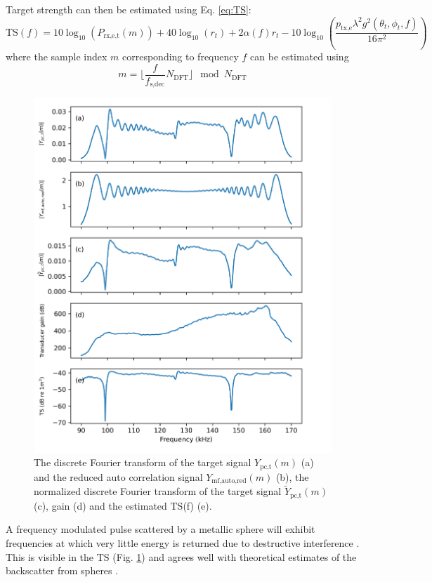 \documentclass[preprint,12pt,TurnOnLineNumbers]{JASAnew}
\newcommand{\freqsym}{f}
\newcommand{\samplesymf}{m}
\newcommand{\fsdec}{f_{\textrm{s,dec}}}
\newcommand{\ptxe}{p_{\textrm{tx,e}}}
\newcommand{\ypctargetf}{Y_{\textrm{pc,t}}}
\newcommand{\ypctargetnormf}{\tilde{Y}_{\textrm{pc,t}}}
\newcommand{\ymfautoredf}{Y_{\textrm{mf,auto,red}}}
\newcommand{\prxetf}{P_{\textrm{rx,e,t}}}
\newcommand{\ts}{\textrm{TS}}
\newcommand{\range}{r}
\newcommand{\athw}{\phi}
\newcommand{\along}{\theta}
\newcommand{\gain}{g}
\newcommand{\wlen}{\lambda}
\newcommand{\absorp}{\alpha}
\newcommand{\ndft}{{N_{\textrm{DFT}}}}
\begin{document}
Target strength can then be estimated using Eq. \ref{eq:TS}:
\begin{equation}
\label{eq:TS_f}
\ts(\freqsym) = 10\log_{10}(\prxetf(\samplesymf)) + 40\log_{10}(\range_t) + 2\absorp(\freqsym)\range_t - 10\log_{10}\left( \frac{\ptxe \wlen^2 \gain^2(\along_t,\athw_t,f)}{16\pi^2} \right)
\end{equation}
where the sample index $\samplesymf$ corresponding to frequency $\freqsym$ can be estimated using
\begin{equation}
\label{eq:m(f)}
\samplesymf = \lfloor \frac{\freqsym}{\fsdec} \ndft \rfloor \mod \ndft
\end{equation}
%
\begin{figure}
\includegraphics[width=16cm]{Fig_TS}
\caption{\label{fi:TS}The discrete Fourier transform of the target signal $\ypctargetf(\samplesymf)$ (a) and the reduced auto correlation signal $\ymfautoredf(\samplesymf)$ (b), the normalized discrete Fourier transform of the target signal $\ypctargetnormf(\samplesymf)$ (c), gain (d) and the estimated TS(f) (e).}
\end{figure}
%
A frequency modulated pulse scattered by a metallic sphere will exhibit frequencies at which very little energy is returned due to destructive interference \citep{stanton2008}. This is visible in the $\ts$ (Fig. \ref{fi:TS}) and agrees well with theoretical estimates of the backscatter from spheres \citep{maclennan1981}.
\end{document}
